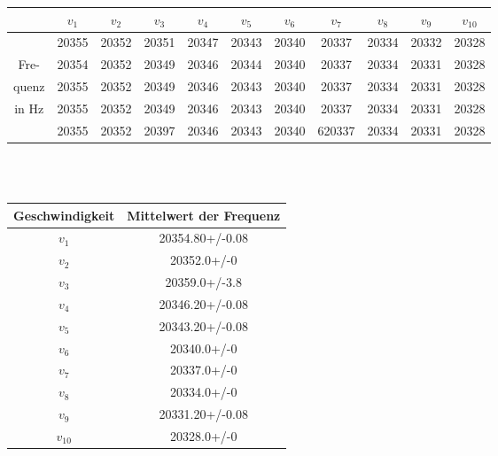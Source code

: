 \begin{center}
\begin{tabular}{c||c|c|c|c|c|c|c|c|c|c}
	& $v_1$ & $v_2$ & $v_3$ & $v_4$ & $v_5$ & $v_6$ & $v_7$ & $v_8$ & $v_9$ & $v_{10}$ \\
	\hline
	& 20355 & 20352 & 20351 & 20347 & 20343 & 20340 & 20337 & 20334 & 20332 & 20328 \\
	Fre- & 20354 & 20352 & 20349 & 20346 & 20344 & 20340 & 20337 & 20334 & 20331 & 20328 \\
	quenz & 20355 & 20352 & 20349 & 20346 & 20343 & 20340 & 20337 & 20334 & 20331 & 20328 \\
	in Hz & 20355 & 20352 & 20349 & 20346 & 20343 & 20340 & 20337 & 20334 & 20331 & 20328 \\
	& 20355 & 20352 & 20397 & 20346 & 20343 & 20340 & 620337 & 20334 & 20331 & 20328 \\
\end{tabular}
\ \\
\ \\
\begin{tabular}{c|c}
	Geschwindigkeit & Mittelwert der Frequenz \\
	\hline
	$v_1$ & 20354.80+/-0.08 \\
	$v_2$ & 20352.0+/-0 \\
	$v_3$ & 20359.0+/-3.8 \\
	$v_4$ & 20346.20+/-0.08 \\
	$v_5$ & 20343.20+/-0.08 \\
	$v_6$ & 20340.0+/-0 \\
	$v_7$ & 20337.0+/-0 \\
	$v_8$ & 20334.0+/-0 \\
	$v_9$ & 20331.20+/-0.08 \\
	$v_{10}$ & 20328.0+/-0 \\	
\end{tabular}


\end{center}
